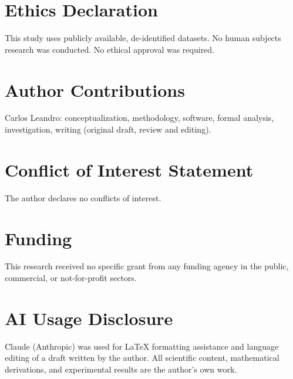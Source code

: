 \documentclass[12pt,a4paper]{article}
\begin{document}
\section*{Ethics Declaration}

This study uses publicly available, de-identified datasets.
No human subjects research was conducted.
No ethical approval was required.

\section*{Author Contributions}

Carlos Leandro: conceptualization, methodology, software, formal analysis,
investigation, writing (original draft, review and editing).

\section*{Conflict of Interest Statement}

The author declares no conflicts of interest.

\section*{Funding}

This research received no specific grant from any funding agency in the public,
commercial, or not-for-profit sectors.

\section*{AI Usage Disclosure}

Claude (Anthropic) was used for LaTeX formatting assistance and language
editing of a draft written by the author.
All scientific content, mathematical derivations, and experimental results are
the author's own work.



\end{document}
